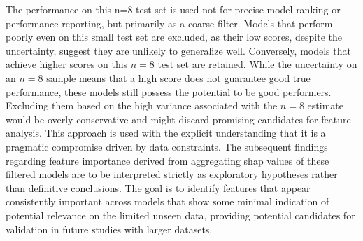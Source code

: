 \documentclass[12pt,a4paper]{report}
\begin{document}
The performance on this n=8 test set is used not for precise model ranking or performance reporting, but primarily as a coarse filter. Models that perform poorly even on this small test set are excluded, as their low scores, despite the uncertainty, suggest they are unlikely to generalize well. Conversely, models that achieve higher scores on this $n=8$ test set are retained. While the uncertainty on an $n=8$ sample means that a high score does not guarantee good true performance, these models still possess the potential to be good performers. Excluding them based on the high variance associated with the $n=8$ estimate would be overly conservative and might discard promising candidates for feature analysis. This approach is used with the explicit understanding that it is a pragmatic compromise driven by data constraints. The subsequent findings regarding feature importance derived from aggregating \gls{shap} values of these filtered models are to be interpreted strictly as exploratory hypotheses rather than definitive conclusions. The goal is to identify features that appear consistently important across models that show some minimal indication of potential relevance on the limited unseen data, providing potential candidates for validation in future studies with larger datasets.
\end{document}
